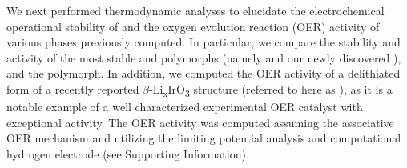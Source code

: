 %



%
%
We next performed  thermodynamic analyses to elucidate the electrochemical operational stability of \IrOx and the oxygen evolution reaction (OER) activity of various \IrOthree phases previously computed.
%
In particular, we compare the stability and activity of the most stable \IrOtwo and \IrOthree polymorphs
(namely \rIrOtwo and our newly discovered \aIrOthree),
and the \rIrOthree polymorph.
%
In addition, we computed the OER activity of a delithiated form of a recently reported $\beta$-Li\textsubscript{x}IrO\textsubscript{3} structure
(referred to here as \bIrOthree),
as it is a notable example of a well characterized experimental \IrOthree OER catalyst with exceptional activity.
\cite{Pearce2017,Pearce2019}
%
The OER activity was computed assuming the associative OER mechanism and utilizing the limiting potential analysis and computational hydrogen electrode (see Supporting Information).
\cite{Man2011,Rossmeisl2007,Kitchin2004}


